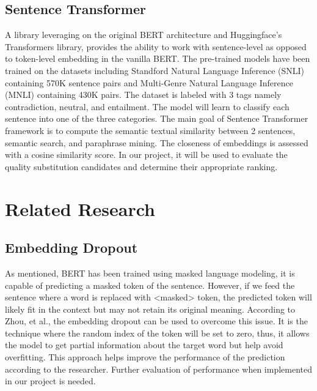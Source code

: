 \documentclass[12pt,oneside,openright,a4paper]{cpe-english-project}
\begin{document}
\subsection{Sentence Transformer} 
A library leveraging on the original BERT architecture and Huggingface’s Transformers library, provides the ability to work with sentence-level as opposed to token-level embedding in the vanilla BERT. The pre-trained models have been trained on the datasets including Standford Natural Language Inference (SNLI) containing 570K sentence pairs and Multi-Genre Natural Language Inference (MNLI) containing 430K pairs. The dataset is labeled with 3 tags namely contradiction, neutral, and entailment. The model will learn to classify each sentence into one of the three categories. The main goal of Sentence Transformer framework is to compute the semantic textual similarity between 2 sentences, semantic search, and paraphrase mining. The closeness of embeddings is assessed with a cosine similarity score. In our project, it will be used to evaluate the quality substitution candidates and determine their appropriate ranking.

\section{Related Research}
\subsection{Embedding Dropout}
As mentioned, BERT has been trained using masked language modeling, it is capable of predicting a masked token of the sentence. However, if we feed the sentence where a word is replaced with <masked> token, the predicted token will likely fit in the context but may not retain its original meaning. According to Zhou, et al.\cite{k}\cite{o}, the embedding dropout can be used to overcome this issue. It is the technique where the random index of the token will be set to zero, thus, it allows the model to get partial information about the target word but help avoid overfitting. This approach helps improve the performance of the prediction according to the researcher. Further evaluation of performance when implemented in our project is needed.
\end{document}
